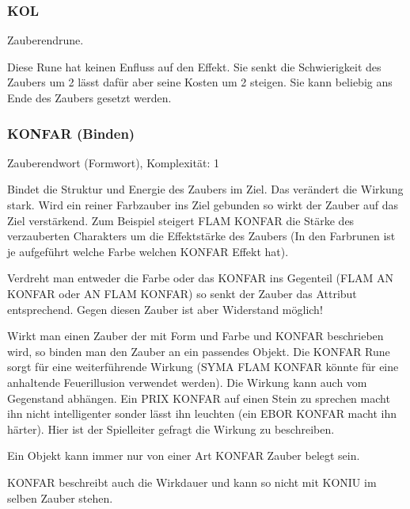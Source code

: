 \documentclass{article}
\begin{document}
\subsubsection{KOL}

Zauberendrune.

Diese Rune hat keinen Enfluss auf den Effekt. Sie senkt die Schwierigkeit des Zaubers um 2 lässt dafür aber seine
Kosten um 2 steigen. Sie kann beliebig ans Ende des Zaubers gesetzt werden.

\subsubsection{KONFAR (Binden)}

Zauberendwort (Formwort), Komplexität: 1

Bindet die Struktur und Energie des Zaubers im Ziel. Das verändert die Wirkung stark. Wird ein reiner Farbzauber ins
Ziel gebunden so wirkt der Zauber auf das Ziel verstärkend. Zum Beispiel steigert FLAM KONFAR die Stärke des
verzauberten Charakters um die Effektstärke des Zaubers (In den Farbrunen ist je aufgeführt welche Farbe welchen
KONFAR Effekt hat).

Verdreht man entweder die Farbe oder das KONFAR ins Gegenteil (FLAM AN KONFAR oder AN FLAM KONFAR) so senkt der Zauber
das Attribut entsprechend. Gegen diesen Zauber ist aber Widerstand möglich!

Wirkt man einen Zauber der mit Form und Farbe und KONFAR beschrieben wird, so binden man den Zauber an ein passendes
Objekt. Die KONFAR Rune sorgt für eine weiterführende Wirkung (SYMA FLAM KONFAR könnte für eine anhaltende
Feuerillusion verwendet werden). Die Wirkung kann auch vom Gegenstand abhängen. Ein PRIX KONFAR auf einen Stein zu
sprechen macht ihn nicht intelligenter sonder lässt ihn leuchten (ein EBOR KONFAR macht ihn härter). Hier ist der
Spielleiter gefragt die Wirkung zu beschreiben.

Ein Objekt kann immer nur von einer Art KONFAR Zauber belegt sein.

KONFAR beschreibt auch die Wirkdauer und kann so nicht mit KONIU im selben Zauber stehen.
\end{document}
